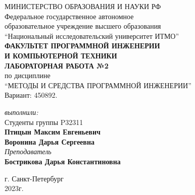 
\begin{center}
	МИНИСТЕРСТВО ОБРАЗОВАНИЯ И НАУКИ РФ\\
	\hfill \break
	Федеральное государственное автономное\\
	образовательное учреждение высшего образования\\
	``Национальный исследовательский университет ИТМО''\\
	\hfill \break
	\textbf{ФАКУЛЬТЕТ ПРОГРАММНОЙ ИНЖЕНЕРИИ \\
	И КОМПЬЮТЕРНОЙ ТЕХНИКИ}\\
	\vspace{2cm}
	\large{\textbf{ЛАБОРАТОРНАЯ РАБОТА №2}}\\
	\hfill \break
	по дисциплине\\
		\large{``МЕТОДЫ И СРЕДСТВА ПРОГРАММНОЙ ИНЖЕНЕРИИ''}\\
	\hfill \break
	Вариант: 450892. \\
	\vspace{5cm}
	\begin{flushright}
	\textit{выполнили:}\\
	Студенты группы P32311\\
	\textbf{Птицын Максим Евгеньевич}\\
	\textbf{Воронина Дарья Сергеевна}\\
	\textit{Преподаватель}\\
	\textbf{Бострикова Дарья Константиновна}
	\end{flushright}
\end{center}

\vfill

\begin{center}
	г. Санкт-Петербург\\2023г.
\end{center}
\thispagestyle{empty}
\BgThispage

\newpage